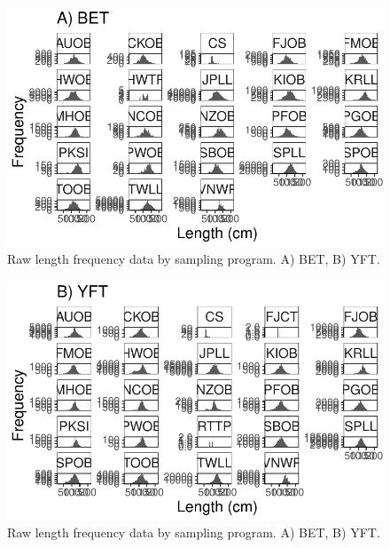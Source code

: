 \documentclass[
  letterpaper,
  DIV=11,
  numbers=noendperiod]{scrartcl}
\begin{document}
\begin{figure}

{\centering \includegraphics{length_data_explore_files/figure-pdf/raw_len_by_orig-1.pdf}

}

\caption{Raw length frequency data by sampling program. A) BET, B) YFT.}

\end{figure}

\begin{figure}

{\centering \includegraphics{length_data_explore_files/figure-pdf/raw_len_by_orig-2.pdf}

}

\caption{Raw length frequency data by sampling program. A) BET, B) YFT.}

\end{figure}
\end{document}

